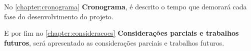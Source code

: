 \par
No \autoref{chapter:cronograma} \textbf{Cronograma}, é descrito o tempo que demorará cada fase do desenvolvimento do projeto.

\par
E por fim no \autoref{chapter:consideracoes} \textbf{Considerações parciais e trabalhos futuros}, será apresentado as considerações parciais e trabalhos futuros.